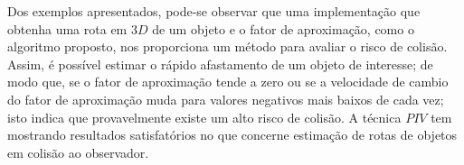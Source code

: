 
\begin{comment}
From the presented examples,
it can be observed that one application that uses the tracking
and the departure factor is related with the risk of collision.
It is possible to estimate how of fast an object is departing.
Thus, if the  departure factor tends to zero or 
if the velocity of departure factor changes to lower negatives values every time, 
probably, there is a high risk of collision. The $PIV$ technique has presented satisfactory results. 
It can be concluded that estimating collision using velocity of departure factor, 
tracking of objects in 2 or 3 dimensions, and departure distance
relative to the first position of $ROI$. 
The simulations in both cases has given promissory results.
\end{comment}

Dos exemplos apresentados, pode-se observar que uma implementação 
que obtenha uma rota em $3D$ de um objeto e o 
fator de aproximação, como o algoritmo proposto, nos proporciona um método para avaliar o risco de colisão.
Assim, é possível estimar o rápido afastamento de um objeto de interesse;
de modo que, se o fator de aproximação tende a zero ou se a velocidade de cambio 
do fator de aproximação muda 
para valores negativos mais baixos de cada vez; isto indica que
provavelmente existe um alto risco de colisão.
A técnica $PIV$ tem mostrando resultados satisfatórios no que concerne estimação 
de rotas de objetos em colisão ao observador.
